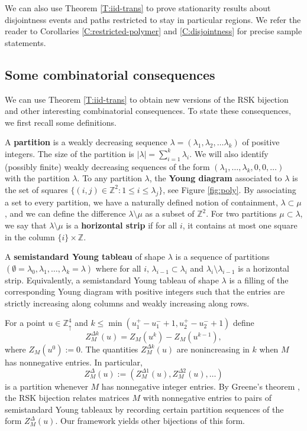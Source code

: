 \documentclass[aop, preprint]{imsart}
\theoremstyle{plain}
\theoremstyle{definition}
\theoremstyle{plain}
\newcommand{\sset}{\subset}
\newcommand{\la}{\lambda}
\newcommand{\Zd}{\mathds{Z}^4_\uparrow}
\newcommand{\Z}{\mathds{Z}}
\newcommand{\X}{\times}
\newcommand{\smin}{\setminus}
\begin{document}

We can also use Theorem \ref{T:iid-trans} to prove stationarity results about disjointness events and paths restricted to stay in particular regions. We refer the reader to Corollaries \ref{C:restricted-polymer} and \ref{C:disjointness} for precise sample statements.

\subsection{Some combinatorial consequences}
\label{SS:combinatorial}
We can use Theorem \ref{T:iid-trans} to obtain new versions of the RSK bijection and other interesting combinatorial consequences. To state these consequences, we first recall some definitions.

A \textbf{partition} is a weakly decreasing sequence $\la = (\la_1, \la_2, \dots \la_k)$ of positive integers. The size of the partition is $|\la| = \sum_{i=1}^k \la_i$. We will also identify (possibly finite) weakly decreasing sequences of the form $(\la_1, \dots, \la_k, 0, 0,\dots)$ with the partition $\la$. To any partition $\la$, the \textbf{Young diagram} associated to $\la$ is the set of squares $\{(i, j) \in \Z^2 : 1 \le i \le \la_j \}$, see Figure \ref{fig:poly}. By associating a set to every partition, we have a naturally defined notion of containment, $\la \sset \mu$, and we can define the difference $\la \smin \mu$ as a subset of $\Z^2$. For two partitions $\mu \sset \la$, we say that $\la \smin \mu$ is a \textbf{horizontal strip} if for all $i$, it contains at most one square in the column $\{i\} \X \Z$.

A \textbf{semistandard Young tableau} of shape $\la$ is a sequence of partitions $(\emptyset = \la_0, \la_1, \dots, \la_k = \la)$ where for all $i$, $\la_{i-1} \sset \la_i$ and $\la_i \smin \la_{i-1}$ is a horizontal strip. Equivalently, a semistandard Young tableau of shape $\la$ is a filling of the corresponding Young diagram with positive integers such that the entries are strictly increasing along columns and weakly increasing along rows. 

For a point $u \in \Zd$ and $k \le \min(u^+_1 - u^-_1 + 1, u^+_2 - u^-_2 + 1)$ define
$$
Z^{\Delta k}_M(u) = Z_M(u^k) - Z_M(u^{k-1}),
$$
where $Z_M(u^0) := 0$. The quantities $Z^{\Delta k}_M(u)$ are nonincreasing in $k$ when $M$ has nonnegative entries. In particular, 
$$
Z^\Delta_M(u) :=(Z^{\Delta 1}_M(u), Z^{\Delta 2}_M(u), \dots)
$$
is a partition whenever $M$ has nonnegative integer entries. By Greene's theorem \citep{greene1974extension}, the RSK bijection relates matrices $M$ with nonnegative entries to pairs of semistandard Young tableaux by recording certain partition sequences of the form $Z^\Delta_M(u)$. Our framework yields other bijections of this form.
\end{document}
